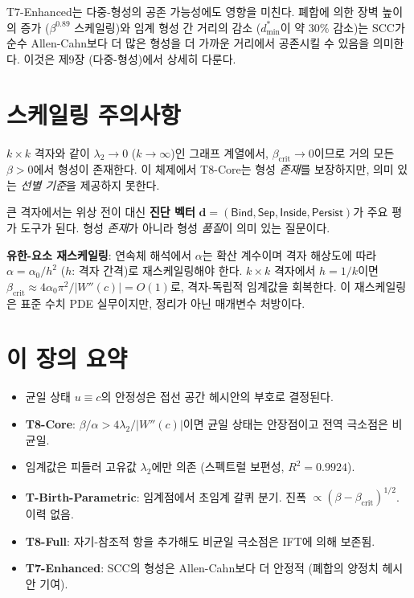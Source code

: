 T7-Enhanced는 다중-형성의 공존 가능성에도 영향을 미친다. 폐합에 의한 장벽 높이의 증가 ($\beta^{0.89}$ 스케일링)와 임계 형성 간 거리의 감소 ($d_{\min}^*$이 약 $30\%$ 감소)는 SCC가 순수 Allen-Cahn보다 더 많은 형성을 더 가까운 거리에서 공존시킬 수 있음을 의미한다. 이것은 제9장 (다중-형성)에서 상세히 다룬다.


\section{스케일링 주의사항}
\label{sec:scaling-caveat}

$k \times k$ 격자와 같이 $\lambda_2 \to 0$ ($k \to \infty$)인 그래프 계열에서, $\beta_{\mathrm{crit}} \to 0$이므로 거의 모든 $\beta > 0$에서 형성이 존재한다. 이 체제에서 T8-Core는 형성 \emph{존재}를 보장하지만, 의미 있는 \emph{선별 기준}을 제공하지 못한다.

큰 격자에서는 위상 전이 대신 \textbf{진단 벡터} $\mathbf{d} = (\mathsf{Bind}, \mathsf{Sep}, \mathsf{Inside}, \mathsf{Persist})$가 주요 평가 도구가 된다. 형성 \emph{존재}가 아니라 형성 \emph{품질}이 의미 있는 질문이다.

\textbf{유한-요소 재스케일링}: 연속체 해석에서 $\alpha$는 확산 계수이며 격자 해상도에 따라 $\alpha = \alpha_0 / h^2$ ($h$: 격자 간격)로 재스케일링해야 한다. $k \times k$ 격자에서 $h = 1/k$이면 $\beta_{\mathrm{crit}} \approx 4\alpha_0 \pi^2 / |W''(c)| = O(1)$로, 격자-독립적 임계값을 회복한다. 이 재스케일링은 표준 수치 PDE 실무이지만, 정리가 아닌 매개변수 처방이다.


\section*{이 장의 요약}

\begin{itemize}
    \item 균일 상태 $u \equiv c$의 안정성은 접선 공간 헤시안의 부호로 결정된다.
    \item \textbf{T8-Core}: $\beta/\alpha > 4\lambda_2/|W''(c)|$이면 균일 상태는 안장점이고 전역 극소점은 비균일.
    \item 임계값은 피들러 고유값 $\lambda_2$에만 의존 (스펙트럴 보편성, $R^2 = 0.9924$).
    \item \textbf{T-Birth-Parametric}: 임계점에서 초임계 갈퀴 분기. 진폭 $\propto (\beta - \beta_{\mathrm{crit}})^{1/2}$. 이력 없음.
    \item \textbf{T8-Full}: 자기-참조적 항을 추가해도 비균일 극소점은 IFT에 의해 보존됨.
    \item \textbf{T7-Enhanced}: SCC의 형성은 Allen-Cahn보다 더 안정적 (폐합의 양정치 헤시안 기여).
\end{itemize}
